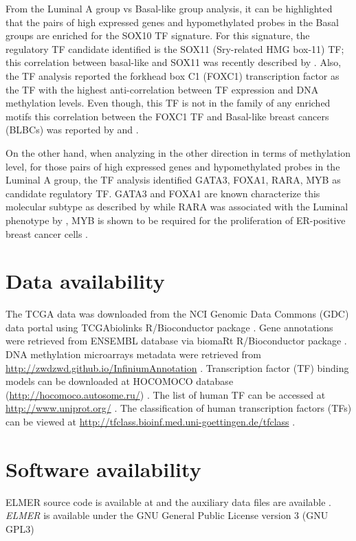 From the  Luminal A group vs Basal-like group analysis, it can be highlighted that the pairs of high expressed genes and hypomethylated probes in the Basal groups are enriched for the SOX10 TF signature. For this signature, the regulatory TF candidate identified is the SOX11 (Sry-related HMG box-11) TF; this correlation between basal-like and SOX11 was recently described by . Also, the TF analysis  reported the forkhead box C1 (FOXC1) transcription factor as the TF with the highest anti-correlation between TF expression and DNA methylation levels. Even though, this TF is not in the family of any enriched motifs this correlation between the FOXC1 TF and Basal-like breast cancers (BLBCs) was reported by  and .

On the other hand, when analyzing in the other direction in terms of methylation level, for  those pairs of high expressed genes and hypomethylated probes in the Luminal A group, the TF analysis identified GATA3, FOXA1, RARA, MYB as candidate regulatory TF. GATA3 and FOXA1 are known characterize this  molecular subtype  as described by  while RARA was associated with the Luminal phenotype by , MYB
is shown to be required for the proliferation of ER-positive breast cancer cells \cite{mitra2016cdk9}.

\section*{Data availability} %
The TCGA data was downloaded from the NCI Genomic Data Commons (GDC) data portal \cite{grossman2016toward} using TCGAbiolinks R/Bioconductor package \cite{colaprico2015tcgabiolinks,10.12688/f1000research.8923.2}.
Gene annotations were retrieved from ENSEMBL \cite{yates2015ensembl} database via biomaRt R/Bioconductor package \cite{durinck2005biomart,durinck2009mapping}.
DNA methylation microarrays metadata were retrieved from \url{http://zwdzwd.github.io/InfiniumAnnotation} \cite{doi:10.1093/nar/gkw967}.
Transcription factor (TF) binding models can be downloaded at HOCOMOCO database (\url{http://hocomoco.autosome.ru/}) \cite{kulakovskiy2016hocomoco}.
The list of human TF can be accessed at \url{http://www.uniprot.org/}  \cite{apweiler2004uniprot}.
The classification of human transcription factors (TFs) can be viewed at \url{http://tfclass.bioinf.med.uni-goettingen.de/tfclass}  \cite{wingender2013tfclass}.

\section*{Software availability}

ELMER	source code  is available at 
and the auxiliary data files are available .
\textit{ELMER} is available under the GNU General Public License version 3 (GNU GPL3)
